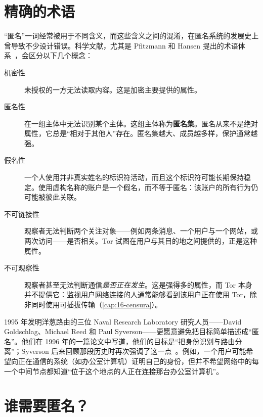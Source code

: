 \section{精确的术语}\label{sec:anon-termini}

“匿名”一词经常被用于不同含义，而这些含义之间的混淆，在匿名系统的发展史上曾导致不少设计错误。科学文献，尤其是 Pfitzmann 和 Hansen 提出的术语体系~\cite{pfitzmann2010terminology}，会区分以下几个概念：
\begin{description}
  \item[机密性] 未授权的一方无法读取内容。这是加密主要提供的属性。
  \item[匿名性] 在一组主体中无法识别某个主体。这组主体称为\textbf{匿名集}。匿名从来不是绝对属性，它总是“相对于其他人”存在。匿名集越大、成员越多样，保护通常越强。
  \item[假名性] 一个人使用并非真实姓名的标识符活动，而且这个标识符可能长期保持稳定。使用虚构名称的账户是一个假名，而不等于匿名：该账户的所有行为仍可能被彼此关联。
  \item[不可链接性] 观察者无法判断两个关注对象——例如两条消息、一个用户与一个网站，或两次访问——是否相关。Tor 试图在用户与其目的地之间提供的，正是这种属性。
  \item[不可观察性] 观察者甚至无法判断通信\emph{是否正在发生}。这是强得多的属性，而 Tor 本身并不提供它：监视用户网络连接的人通常能够看到该用户正在使用 Tor，除非同时使用可插拔传输（\cref{cap:16-censura}）。
\end{description}

\begin{storia}[把身份识别与路由分离]
1995 年发明洋葱路由的三位 Naval Research Laboratory 研究人员——David Goldschlag、Michael Reed 和 Paul Syverson——更愿意避免把目标简单描述成“匿名”。他们在 1996 年的一篇论文中写道，他们的目标是\enquote{把身份识别与路由分离}；Syverson 后来回顾那段历史时再次强调了这一点~\cite{syverson2011peel}。例如，一个用户可能希望向正在通信的系统（如办公室计算机）证明自己的身份，但并不希望网络中的每一个中间节点都知道“位于这个地点的人正在连接那台办公室计算机”。
\end{storia}

\section{谁需要匿名？}\label{sec:anon-utenti}

